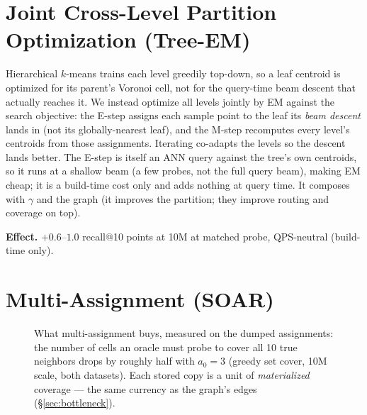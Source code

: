 \documentclass{article}
\newcommand{\effect}[1]{\par\smallskip\noindent\textbf{Effect.} #1}
\begin{document}
\section{Joint Cross-Level Partition Optimization (Tree-EM)}
\label{sec:em}
Hierarchical $k$-means trains each level greedily top-down, so a leaf centroid is
optimized for its parent's Voronoi cell, not for the query-time beam descent that
actually reaches it. We instead optimize all levels jointly by EM against the
search objective: the E-step assigns each sample point to the leaf its \emph{beam
descent} lands in (not its globally-nearest leaf), and the M-step recomputes every
level's centroids from those assignments. Iterating co-adapts the levels so the
descent lands better. The E-step is itself an ANN query against the tree's own
centroids, so it runs at a shallow beam (a few probes, not the full query beam),
making EM cheap; it is a build-time cost only and adds nothing at query time. It
composes with $\gamma$ and the graph (it improves the partition; they improve
routing and coverage on top).
\effect{$+0.6$--$1.0$ recall@10 points at 10M at matched probe, QPS-neutral
(build-time only).}

\section{Multi-Assignment (SOAR)}
\begin{figure}[t]
\centering
{}
\caption{What multi-assignment buys, measured on the dumped assignments: the number of
cells an oracle must probe to cover all 10 true neighbors drops by roughly half with
$a_0{=}3$ (greedy set cover, 10M scale, both datasets). Each stored copy is a unit of
\emph{materialized} coverage --- the same currency as the graph's edges
(\S\ref{sec:bottleneck}).}
\label{fig:soar}
\end{figure}
\end{document}
